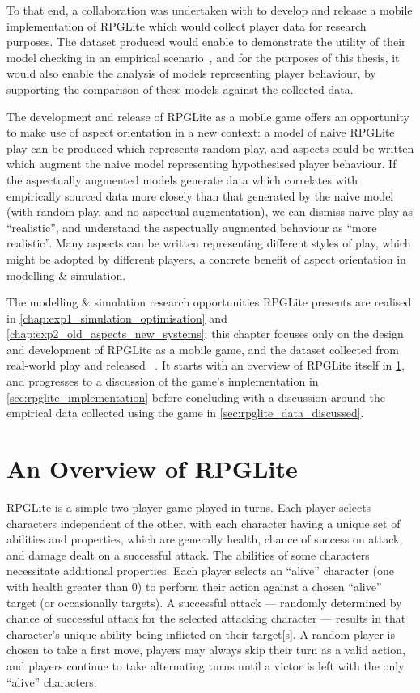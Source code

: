 To that end, a collaboration was undertaken with \citeauthor{kavanagh2021thesis}
to develop and release a mobile implementation of RPGLite which would collect
player data for research purposes. The dataset produced would enable
\citeauthor{kavanagh2021thesis} to demonstrate the utility of their model
checking in an empirical scenario~\cite{kavanagh2021thesis}, and for the
purposes of this thesis, it would also enable the analysis of models
representing player behaviour, by supporting the comparison of these models
against the collected data.

The development and release of RPGLite as a mobile game offers an opportunity to
make use of aspect orientation in a new context: a model of naive RPGLite play
can be produced which represents random play, and aspects could be written which
augment the naive model representing hypothesised player behaviour. If the
aspectually augmented models generate data which correlates with empirically
sourced data more closely than that generated by the naive model (with random
play, and no aspectual augmentation), we can dismiss naive play as
``realistic'', and understand the aspectually augmented behaviour as ``more
realistic''. Many aspects can be written representing different styles of play,
which might be adopted by different players, a concrete benefit of aspect
orientation in modelling \& simulation.

The modelling \& simulation research opportunities RPGLite presents are realised
in \cref{chap:exp1_simulation_optimisation} and
\cref{chap:exp2_old_aspects_new_systems}; this chapter focuses only on the
design and development of RPGLite as a mobile game, and the dataset collected
from real-world play and released
~\cite{wallis_game_on_2020,RPGLiteLessonsLearned}. It starts with an overview of
RPGLite itself in \cref{sec:rpglite_overview}, and progresses to a discussion of
the game's implementation in \cref{sec:rpglite_implementation} before concluding
with a discussion around the empirical data collected using the game in \cref{sec:rpglite_data_discussed}.

\section{An Overview of RPGLite}\label{sec:rpglite_overview}

RPGLite is a simple two-player game played in turns. Each player selects
characters independent of the other, with each character having a unique set of
abilities and properties, which are generally health, chance of success on
attack, and damage dealt on a successful attack. The abilities of some
characters necessitate additional properties. Each player selects an ``alive''
character (one with health greater than 0) to perform their action against a
chosen ``alive'' target (or occasionally targets). A successful attack ---
randomly determined by chance of successful attack for the selected attacking
character --- results in that character's unique ability being inflicted on
their target[s]. A random player is chosen to take a first move, players may
always skip their turn as a valid action, and players continue to take
alternating turns until a victor is left with the only ``alive'' characters.

